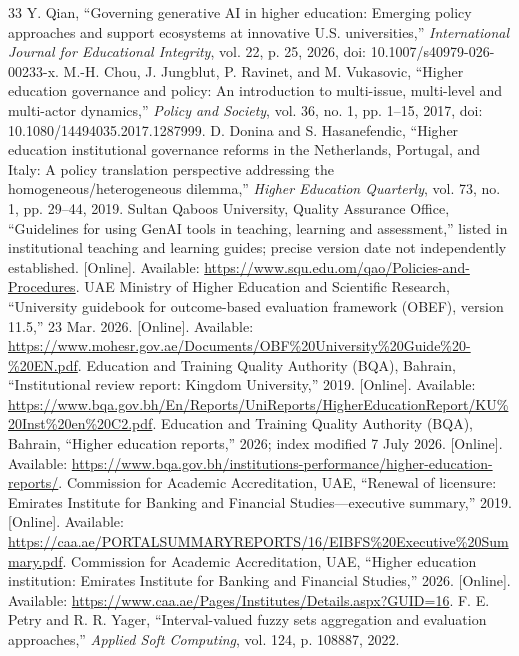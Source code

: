 \documentclass[conference,letterpaper]{IEEEtran}
\begin{document}
\begin{thebibliography}{33}
 Y. Qian, ``Governing generative AI in higher education: Emerging policy approaches and support ecosystems at innovative U.S. universities,'' \emph{International Journal for Educational Integrity}, vol. 22, p. 25, 2026, doi: 10.1007/s40979-026-00233-x.
 M.-H. Chou, J. Jungblut, P. Ravinet, and M. Vukasovic, ``Higher education governance and policy: An introduction to multi-issue, multi-level and multi-actor dynamics,'' \emph{Policy and Society}, vol. 36, no. 1, pp. 1--15, 2017, doi: 10.1080/14494035.2017.1287999.
 D. Donina and S. Hasanefendic, ``Higher education institutional governance reforms in the Netherlands, Portugal, and Italy: A policy translation perspective addressing the homogeneous/heterogeneous dilemma,'' \emph{Higher Education Quarterly}, vol. 73, no. 1, pp. 29--44, 2019.
 Sultan Qaboos University, Quality Assurance Office, ``Guidelines for using GenAI tools in teaching, learning and assessment,'' listed in institutional teaching and learning guides; precise version date not independently established. [Online]. Available: \url{https://www.squ.edu.om/qao/Policies-and-Procedures}.
 UAE Ministry of Higher Education and Scientific Research, ``University guidebook for outcome-based evaluation framework (OBEF), version 11.5,'' 23 Mar. 2026. [Online]. Available: \url{https://www.mohesr.gov.ae/Documents/OBF%20University%20Guide%20-%20EN.pdf}.
 Education and Training Quality Authority (BQA), Bahrain, ``Institutional review report: Kingdom University,'' 2019. [Online]. Available: \url{https://www.bqa.gov.bh/En/Reports/UniReports/HigherEducationReport/KU%20Inst%20en%20C2.pdf}.
 Education and Training Quality Authority (BQA), Bahrain, ``Higher education reports,'' 2026; index modified 7 July 2026. [Online]. Available: \url{https://www.bqa.gov.bh/institutions-performance/higher-education-reports/}.
 Commission for Academic Accreditation, UAE, ``Renewal of licensure: Emirates Institute for Banking and Financial Studies---executive summary,'' 2019. [Online]. Available: \url{https://caa.ae/PORTALSUMMARYREPORTS/16/EIBFS%20Executive%20Summary.pdf}.
 Commission for Academic Accreditation, UAE, ``Higher education institution: Emirates Institute for Banking and Financial Studies,'' 2026. [Online]. Available: \url{https://www.caa.ae/Pages/Institutes/Details.aspx?GUID=16}.
 F. E. Petry and R. R. Yager, ``Interval-valued fuzzy sets aggregation and evaluation approaches,'' \emph{Applied Soft Computing}, vol. 124, p. 108887, 2022.

\end{thebibliography}
\end{document}
